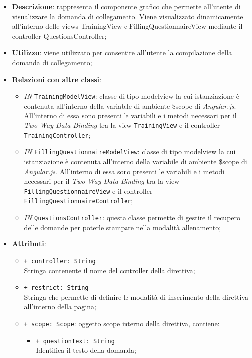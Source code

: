 		\begin{itemize}
			\item \textbf{Descrizione}: rappresenta il componente grafico che permette all'utente di visualizzare la domanda di collegamento. Viene visualizzato dinamicamente all'interno delle views TrainingView e FillingQuestionnaireView mediante il controller QuestionsController;
			\item \textbf{Utilizzo}: viene utilizzato per consentire all'utente la compilazione della domanda di collegamento;
			\item \textbf{Relazioni con altre classi}: 
			\begin{itemize}
				\item \textit{IN} \texttt{TrainingModelView}: classe di tipo modelview la cui istanziazione è contenuta all'interno della variabile di ambiente \$scope di \textit{Angular.js}. All'interno di essa sono presenti le variabili e i metodi necessari per il \textit{Two-Way Data-Binding} tra la view \texttt{TrainingView} e il controller \texttt{TrainingController}; 
				\item \textit{IN} \texttt{FillingQuestionnaireModelView}: classe di tipo modelview la cui istanziazione è contenuta all'interno della variabile di ambiente \$scope di \textit{Angular.js}. All'interno di essa sono presenti le variabili e i metodi necessari per il \textit{Two-Way Data-Binding} tra la view \texttt{FillingQuestionnaireView} e il controller \texttt{FillingQuestionnaireController};
				\item \textit{IN} \texttt{QuestionsController}: questa classe permette di gestire il recupero delle domande per poterle stampare nella modalità allenamento;
			\end{itemize}
			\item \textbf{Attributi}: 
			\begin{itemize}
				\item \texttt{+ controller: String} \\ Stringa contenente il nome del controller della direttiva;
				\item \texttt{+ restrict: String} \\ Stringa che permette di definire le modalità di inserimento della direttiva all'interno della pagina;
				\item \texttt{+ scope: Scope}: oggetto scope interno della direttiva, contiene:
				\begin{itemize}
					\item \texttt{+ questionText: String} \\ Identifica il testo della domanda;

\end{itemize}
\end{itemize}
\end{itemize}
